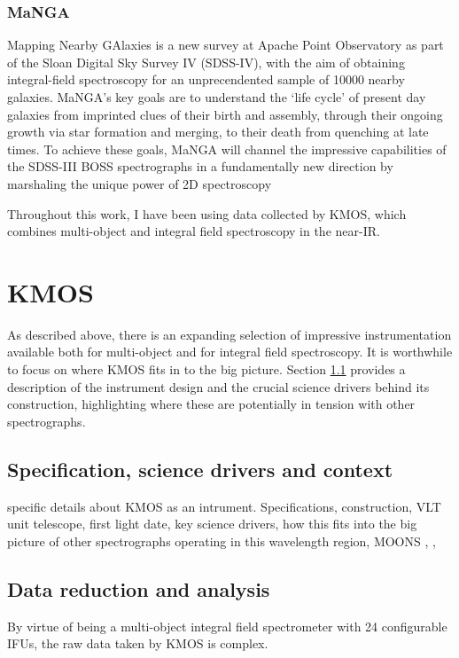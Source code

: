 \documentclass{literature}
\begin{document}
\subsubsection{MaNGA}\label{subsubsec:MaNGA}
Mapping Nearby GAlaxies is a new survey at Apache Point Observatory as part of the Sloan Digital Sky Survey IV (SDSS-IV), with the aim of obtaining integral-field spectroscopy for an unprecendented sample of 10000 nearby galaxies. MaNGA's key goals are to understand the `life cycle' of present day galaxies from imprinted clues of their birth and assembly, through their ongoing growth via star formation and merging, to their death from quenching at late times. To achieve these goals, MaNGA will channel the impressive capabilities of the SDSS-III BOSS spectrographs in a fundamentally new direction by marshaling the unique power of 2D spectroscopy

Throughout this work, I have been using data collected by KMOS, which combines multi-object and integral field spectroscopy in the near-IR. 

\section{KMOS}\label{sec:KMOS}
As described above, there is an expanding selection of impressive instrumentation available both for multi-object and for integral field spectroscopy. It is worthwhile to focus on where KMOS fits in to the big picture. Section \ref{subsec:instrument} provides a description of the instrument design and the crucial science drivers behind its construction, highlighting where these are potentially in tension with other spectrographs.  

\subsection{Specification, science drivers and context}\label{subsec:instrument}
specific details about KMOS as an intrument. Specifications, construction, VLT unit telescope, first light date, key science drivers, how this fits into the big picture of other spectrographs operating in this wavelength region, MOONS 
\citep{Sharples2005}, \citep{Sharples2013}, \citep{Davies2013}


\subsection{Data reduction and analysis}\label{sec:reduction}
By virtue of being a multi-object integral field spectrometer with 24 configurable IFUs, the raw data taken by KMOS is complex.
\end{document}
